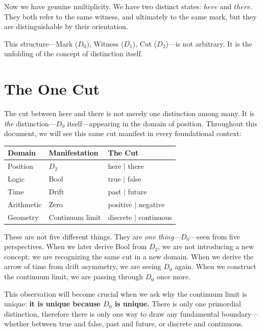 \documentclass[11pt,a4paper]{book}
\def\texttt#1{#1}%
\def\text#1{#1}%
\begin{document}
Now we have genuine multiplicity. We have two distinct states: $\text{here}$ 
and $\text{there}$. They both refer to the same witness, and ultimately to 
the same mark, but they are distinguishable by their orientation.

This structure---Mark ($D_0$), Witness ($D_1$), Cut ($D_2$)---is not 
arbitrary. It is the unfolding of the concept of distinction itself.

\section{The One Cut}
\label{sec:unity-of-cut}

The cut between \texttt{here} and \texttt{there} is not merely one distinction among many. 
It is \emph{the} distinction---$D_0$ itself---appearing in the domain of position. Throughout 
this document, we will see this same cut manifest in every foundational context:

\begin{center}
\begin{tabular}{lll}
\hline
\textbf{Domain} & \textbf{Manifestation} & \textbf{The Cut} \\
\hline
Position & $D_2$ & here $\mid$ there \\
Logic & \texttt{Bool} & true $\mid$ false \\
Time & Drift & past $\mid$ future \\
Arithmetic & Zero & positive $\mid$ negative \\
Geometry & Continuum limit & discrete $\mid$ continuous \\
\hline
\end{tabular}
\end{center}

These are not five different things. They are \emph{one thing}---$D_0$---seen from five 
perspectives. When we later derive Bool from $D_2$, we are not introducing a new concept; 
we are recognizing the same cut in a new domain. When we derive the arrow of time from 
drift asymmetry, we are seeing $D_0$ again. When we construct the continuum limit, we 
are passing through $D_0$ once more.

This observation will become crucial when we ask why the continuum limit is unique: 
\textbf{it is unique because $D_0$ is unique.} There is only one primordial distinction, 
therefore there is only one way to draw any fundamental boundary---whether between true 
and false, past and future, or discrete and continuous.
\end{document}
